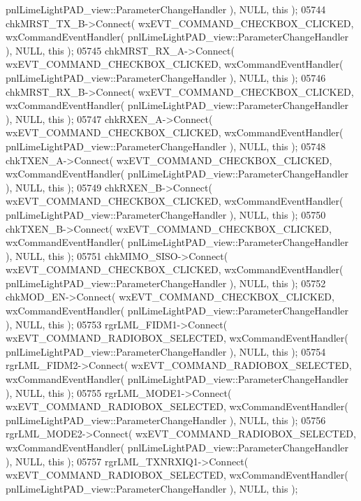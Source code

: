 \begin{DoxyCode}
      pnlLimeLightPAD_view::ParameterChangeHandler ), NULL, \textcolor{keyword}{this} );
05744     chkMRST_TX_B->Connect( wxEVT\_COMMAND\_CHECKBOX\_CLICKED, wxCommandEventHandler( 
      pnlLimeLightPAD_view::ParameterChangeHandler ), NULL, \textcolor{keyword}{this} );
05745     chkMRST_RX_A->Connect( wxEVT\_COMMAND\_CHECKBOX\_CLICKED, wxCommandEventHandler( 
      pnlLimeLightPAD_view::ParameterChangeHandler ), NULL, \textcolor{keyword}{this} );
05746     chkMRST_RX_B->Connect( wxEVT\_COMMAND\_CHECKBOX\_CLICKED, wxCommandEventHandler( 
      pnlLimeLightPAD_view::ParameterChangeHandler ), NULL, \textcolor{keyword}{this} );
05747     chkRXEN_A->Connect( wxEVT\_COMMAND\_CHECKBOX\_CLICKED, wxCommandEventHandler( 
      pnlLimeLightPAD_view::ParameterChangeHandler ), NULL, \textcolor{keyword}{this} );
05748     chkTXEN_A->Connect( wxEVT\_COMMAND\_CHECKBOX\_CLICKED, wxCommandEventHandler( 
      pnlLimeLightPAD_view::ParameterChangeHandler ), NULL, \textcolor{keyword}{this} );
05749     chkRXEN_B->Connect( wxEVT\_COMMAND\_CHECKBOX\_CLICKED, wxCommandEventHandler( 
      pnlLimeLightPAD_view::ParameterChangeHandler ), NULL, \textcolor{keyword}{this} );
05750     chkTXEN_B->Connect( wxEVT\_COMMAND\_CHECKBOX\_CLICKED, wxCommandEventHandler( 
      pnlLimeLightPAD_view::ParameterChangeHandler ), NULL, \textcolor{keyword}{this} );
05751     chkMIMO_SISO->Connect( wxEVT\_COMMAND\_CHECKBOX\_CLICKED, wxCommandEventHandler( 
      pnlLimeLightPAD_view::ParameterChangeHandler ), NULL, \textcolor{keyword}{this} );
05752     chkMOD_EN->Connect( wxEVT\_COMMAND\_CHECKBOX\_CLICKED, wxCommandEventHandler( 
      pnlLimeLightPAD_view::ParameterChangeHandler ), NULL, \textcolor{keyword}{this} );
05753     rgrLML_FIDM1->Connect( wxEVT\_COMMAND\_RADIOBOX\_SELECTED, wxCommandEventHandler( 
      pnlLimeLightPAD_view::ParameterChangeHandler ), NULL, \textcolor{keyword}{this} );
05754     rgrLML_FIDM2->Connect( wxEVT\_COMMAND\_RADIOBOX\_SELECTED, wxCommandEventHandler( 
      pnlLimeLightPAD_view::ParameterChangeHandler ), NULL, \textcolor{keyword}{this} );
05755     rgrLML_MODE1->Connect( wxEVT\_COMMAND\_RADIOBOX\_SELECTED, wxCommandEventHandler( 
      pnlLimeLightPAD_view::ParameterChangeHandler ), NULL, \textcolor{keyword}{this} );
05756     rgrLML_MODE2->Connect( wxEVT\_COMMAND\_RADIOBOX\_SELECTED, wxCommandEventHandler( 
      pnlLimeLightPAD_view::ParameterChangeHandler ), NULL, \textcolor{keyword}{this} );
05757     rgrLML_TXNRXIQ1->Connect( wxEVT\_COMMAND\_RADIOBOX\_SELECTED, wxCommandEventHandler( 
      pnlLimeLightPAD_view::ParameterChangeHandler ), NULL, \textcolor{keyword}{this} );

\end{DoxyCode}
